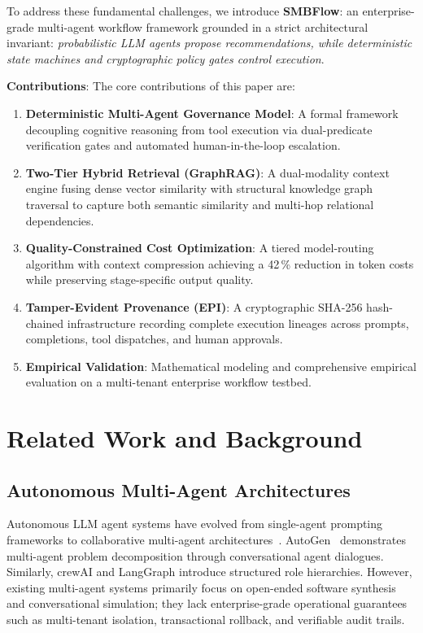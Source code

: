 \documentclass[conference]{IEEEtran}
\begin{document}
To address these fundamental challenges, we introduce \textbf{SMBFlow}: an enterprise-grade multi-agent workflow framework grounded in a strict architectural invariant: \emph{probabilistic LLM agents propose recommendations, while deterministic state machines and cryptographic policy gates control execution}.

\textbf{Contributions}: The core contributions of this paper are:
\begin{enumerate}
    \item \textbf{Deterministic Multi-Agent Governance Model}: A formal framework decoupling cognitive reasoning from tool execution via dual-predicate verification gates and automated human-in-the-loop escalation.
    \item \textbf{Two-Tier Hybrid Retrieval (GraphRAG)}: A dual-modality context engine fusing dense vector similarity with structural knowledge graph traversal to capture both semantic similarity and multi-hop relational dependencies.
    \item \textbf{Quality-Constrained Cost Optimization}: A tiered model-routing algorithm with context compression achieving a 42\,\% reduction in token costs while preserving stage-specific output quality.
    \item \textbf{Tamper-Evident Provenance (EPI)}: A cryptographic SHA-256 hash-chained infrastructure recording complete execution lineages across prompts, completions, tool dispatches, and human approvals.
    \item \textbf{Empirical Validation}: Mathematical modeling and comprehensive empirical evaluation on a multi-tenant enterprise workflow testbed.
\end{enumerate}

\section{Related Work and Background}

\subsection{Autonomous Multi-Agent Architectures}
Autonomous LLM agent systems have evolved from single-agent prompting frameworks to collaborative multi-agent architectures~\cite{wang2023survey, xi2023rise}. AutoGen~\cite{wu2023autogen} demonstrates multi-agent problem decomposition through conversational agent dialogues. Similarly, crewAI and LangGraph introduce structured role hierarchies. However, existing multi-agent systems primarily focus on open-ended software synthesis and conversational simulation; they lack enterprise-grade operational guarantees such as multi-tenant isolation, transactional rollback, and verifiable audit trails.
\end{document}
